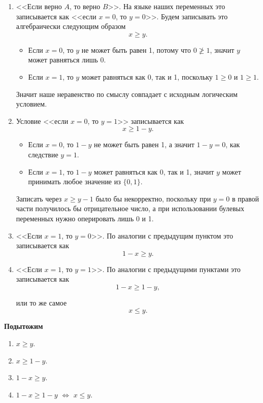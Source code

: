 \begin{enumerate}[nosep]
	\item <<Если верно $A$, то верно $B$>>. На языке наших переменных это записывается как <<если $x = 0$, то $y = 0$>>. Будем записывать это алгебраически следующим образом
	\[
		x \ge y.
	\]
	
	\begin{itemize}[nosep]
		\item Если $x = 0$, то $y$ не может быть равен 1, потому что $0 \ngeq 1$, значит $y$ может равняться лишь 0.
	
		\item Если $x = 1$, то $y$ может равняться как 0, так и 1, поскольку $1 \ge 0$ и $1 \ge 1$.
	\end{itemize}
	
	Значит наше неравенство по смыслу совпадает с исходным логическим условием.
	
	\item Условие <<если $x = 0$, то $y = 1$>> записывается как
	\[
		x \ge 1 - y.
	\]
	
	\begin{itemize}[nosep]
		\item Если $x = 0$, то $1-y$ не может быть равен 1, а значит $1-y=0$, как следствие $y = 1$.
		
		\item Если $x = 1$, то $1-y$ может равняться как 0, так и 1, значит $y$ может принимать любое значение из $\{0, 1\}$.
	\end{itemize}
	
	Записать через $x \ge y - 1$ было бы некорректно, поскольку при $y = 0$ в правой части получилось бы отрицательное число, а при использовании булевых переменных нужно оперировать лишь 0 и 1.
	
	\item <<Если $x = 1$, то $y = 0$>>. По аналогии с предыдущим пунктом это записывается как
	\[
		1-x \ge y.
	\]
	
	\item <<Если $x = 1$, то $y = 1$>>. По аналогии с предыдущими пунктами это записывается как
	\[
		1-x \ge 1 - y,
	\]
	
	или то же самое
	\[
		x \le y.
	\]
	
\end{enumerate}

\textbf{Подытожим}
\begin{enumerate}
	\item {} \qquad\qquad $x \ge y$.

	\item {} \qquad\qquad $x \ge 1 - y$.
	
	\item {} \qquad\qquad $1- x \ge y$.
	
	\item {} \qquad\qquad $1 - x \ge 1 - y$ \quad $\Longleftrightarrow$ \quad $x \le y$.
\end{enumerate}

